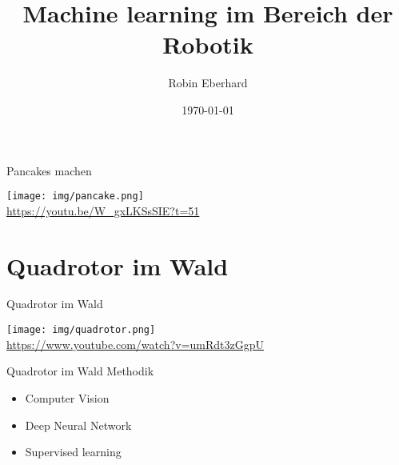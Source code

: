 \documentclass[aspectratio=1610]{beamer}
\title{Machine learning im Bereich der Robotik}
\date{\today}
\author{Robin Eberhard}
\begin{document}
  \maketitle
  \begin{frame}{Pancakes machen}
  \begin{center}
  	\texttt{[image: img/pancake.png]} \\
  	\url{https://youtu.be/W_gxLKSsSIE?t=51}
  \end{center}
  \end{frame}
  
  \section{Quadrotor im Wald}
  \begin{frame}{Quadrotor im Wald}
  \begin{center}
  	\texttt{[image: img/quadrotor.png]} \\
  	\url{https://www.youtube.com/watch?v=umRdt3zGgpU}
  \end{center}
  \end{frame}
  
  \begin{frame}{Quadrotor im Wald}
  Methodik
  	\begin{itemize}
  		\item Computer Vision
  		\item Deep Neural Network
  		\item Supervised learning
  	\end{itemize}
  \end{frame}
  
\end{document}
